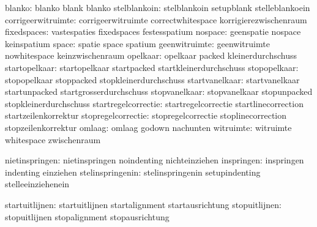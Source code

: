                        blanko:  blanko                       blank
                                blanko
                 stelblankoin:  stelblankoin                 setupblank
                                stelleblankoein
           corrigeerwitruimte:  corrigeerwitruimte           correctwhitespace
                                korrigierezwischenraum
                  fixedspaces:  vastespaties                 fixedspaces
                                festesspatium
                      nospace:  geenspatie                   nospace
                                keinspatium
                        space:  spatie                       space
                                spatium
                geenwitruimte:  geenwitruimte                nowhitespace
                                keinzwischenraum
                     opelkaar:  opelkaar                     packed
                                kleinerdurchschuss
                startopelkaar:  startopelkaar                startpacked
                                startkleinerdurchschuss
                 stopopelkaar:  stopopelkaar                 stoppacked
                                stopkleinerdurchschuss
               startvanelkaar:  startvanelkaar               startunpacked
                                startgrosserdurchschuss
                stopvanelkaar:  stopvanelkaar                stopunpacked
                                stopkleinerdurchschuss
          startregelcorrectie:  startregelcorrectie          startlinecorrection
                                startzeilenkorrektur
           stopregelcorrectie:  stopregelcorrectie           stoplinecorrection
                                stopzeilenkorrektur
                       omlaag:  omlaag                       godown
                                nachunten
                    witruimte:  witruimte                    whitespace
                                zwischenraum

               nietinspringen:  nietinspringen               noindenting
                                nichteinziehen
                   inspringen:  inspringen                   indenting
                                einziehen
             stelinspringenin:  stelinspringenin             setupindenting
                                stelleeinziehenein

               startuitlijnen:  startuitlijnen               startalignment
                                startausrichtung
                stopuitlijnen:  stopuitlijnen                stopalignment
                                stopausrichtung

